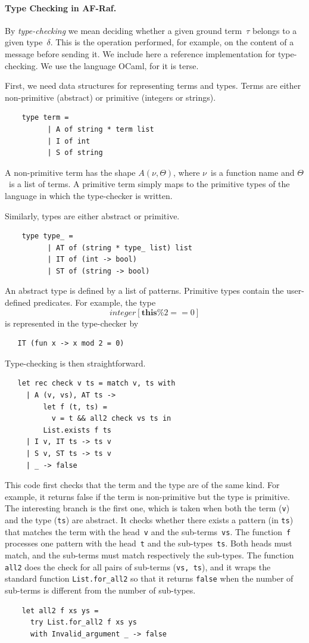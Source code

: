 \documentclass[a4paper,12pt,oneside,fleqn]{book} %
\begin{document}
\paragraph{Type Checking in AF-Raf.}
By \emph{type-checking} we mean deciding whether a given ground term~$\tau$
belongs to a given type~$\delta$. This is the operation performed, for
example, on the content of a message before sending it. We include here a
reference implementation for type-checking. We use the language OCaml, for
it is terse.

First, we need data structures for representing terms and types. Terms are
either non-primitive (abstract) or primitive (integers or strings).
\begin{verbatim}
    type term =
          | A of string * term list
          | I of int
          | S of string
\end{verbatim}
A non-primitive term has the shape $A(\nu,\Theta)$, where $\nu$~is a
function name and $\Theta$~is a list of terms. A primitive term simply maps
to the primitive types of the language in which the type-checker is
written.

Similarly, types are either abstract or primitive.
\begin{verbatim}
    type type_ =
          | AT of (string * type_ list) list
          | IT of (int -> bool)
          | ST of (string -> bool)
\end{verbatim}
An abstract type is defined by a list of patterns. Primitive types contain the
user-defined predicates. For example, the type
\[\mathit{integer}[\mathbf{this}\%2==0]\] is represented in the type-checker by
\begin{verbatim}
   IT (fun x -> x mod 2 = 0)
\end{verbatim}

Type-checking is then straightforward.
\begin{verbatim}
   let rec check v ts = match v, ts with
     | A (v, vs), AT ts ->
         let f (t, ts) =
           v = t && all2 check vs ts in
         List.exists f ts
     | I v, IT ts -> ts v
     | S v, ST ts -> ts v
     | _ -> false
\end{verbatim}
This code first checks that the term and the type are of the same kind. For
example, it returns false if the term is non-primitive but the type is
primitive. The interesting branch is the first one, which is taken when
both the term (\verb|v|) and the type (\verb|ts|) are abstract. It checks whether there exists a
pattern (in \verb|ts|) that matches the term with the head~\verb|v| and the
sub-terms~\verb|vs|. The function~\verb|f| processes one pattern with the
head~\verb|t| and the sub-types~\verb|ts|. Both heads must match, and the
sub-terms must match respectively the sub-types. The function \verb|all2|
does the check for all pairs of sub-terms (\verb|vs, ts|), and it
wraps the standard function \verb|List.for_all2| so that it returns
\verb|false| when the number of sub-terms is different from the number of
sub-types.
\begin{verbatim}
    let all2 f xs ys =
      try List.for_all2 f xs ys
      with Invalid_argument _ -> false
\end{verbatim}
\end{document}
